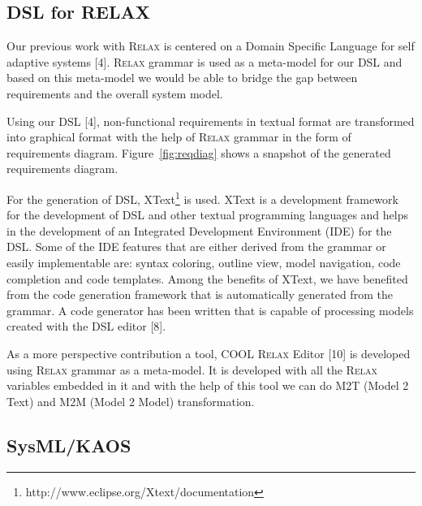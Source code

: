 \documentclass[10pt, conference, compsocconf]{IEEEtran}
\def\myrelax{\textsc{Relax}}                  %
\def\kaos{\textsc{Kaos}}
\newcommand{\Myfig}[1]{Figure~\ref{fig:#1}}
\begin{document}
\subsection{DSL for RELAX}

Our previous work with \myrelax{} is centered on a Domain Specific Language for self adaptive systems [4]. \myrelax{} grammar is used as a meta-model for our DSL and based on this meta-model we would be able to bridge the gap between requirements and the overall system model. 

Using our DSL [4], non-functional requirements in textual format are transformed into graphical format with the help of \myrelax{} grammar in the form of requirements diagram. \Myfig{reqdiag} shows a snapshot of the generated requirements diagram.  



For the generation of DSL, XText\footnote{http://www.eclipse.org/Xtext/documentation} is used. XText is a development framework for the development of DSL and other textual programming languages and helps in the development of an  Integrated Development Environment (IDE) for the DSL. Some of the IDE features that are either derived from the grammar or easily implementable are: syntax coloring, outline view, model navigation, code completion and code templates. Among the benefits of XText, we have benefited from the code generation framework that is automatically generated from the grammar. A code generator has been written that is capable of processing models created with the DSL editor [8]. 


As a more perspective contribution a tool, COOL \myrelax{} Editor [10] is developed using \myrelax{} grammar as a meta-model. It is developed with all the \myrelax{} variables embedded in it and with the help of this tool we can do M2T (Model 2 Text) and M2M (Model 2 Model) transformation. 

\subsection{SysML/KAOS}


\end{document}
